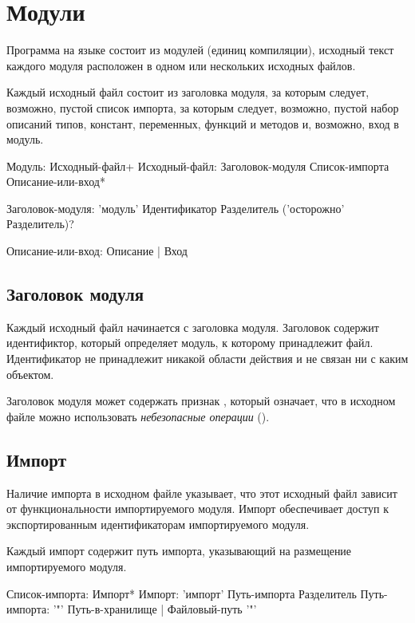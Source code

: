 \hypertarget{modules}{%
\section{Модули}\label{mods:chapter}}

Программа на языке \thelang{} состоит из модулей (единиц компиляции), исходный текст каждого модуля расположен в одном или нескольких исходных файлов.

Каждый исходный файл состоит из заголовка модуля, за которым следует, возможно, пустой список импорта, 
за которым следует, возможно, пустой набор описаний типов, констант, переменных, функций и методов и, возможно, вход в модуль.

\begin{Grammar}
Модуль: Исходный-файл+
Исходный-файл:
    Заголовок-модуля
    Список-импорта
    Описание-или-вход*

Заголовок-модуля:
    'модуль' Идентификатор Разделитель
     ('осторожно' Разделитель)?

Описание-или-вход: Описание | Вход
\end{Grammar} 

\hypertarget{mod-header}{%
\subsection{Заголовок модуля}\label{mods:mod-header}}

Каждый исходный файл начинается с заголовка модуля. Заголовок содержит идентификтор, который определяет модуль,
к которому принадлежит файл. Идентификатор не принадлежит никакой области действия и не связан ни с каким объектом.

Заголовок модуля может содержать признак , который означает, что в исходном файле можно использовать 
\emph{небезопасные операции} ().

\hypertarget{import}{%
\subsection{Импорт}\label{mods:import}}

Наличие импорта в исходном файле указывает, что этот исходный файл зависит от функциональности импортируемого модуля. Импорт обеспечивает доступ к экспортированным идентификаторам импортируемого модуля.

Каждый импорт содержит путь импорта, указывающий на размещение импортируемого модуля.

\begin{Grammar}
Список-импорта: Импорт*
Импорт: 'импорт' Путь-импорта Разделитель
Путь-импорта: '"' Путь-в-хранилище | Файловый-путь '"' 
\end{Grammar} 

